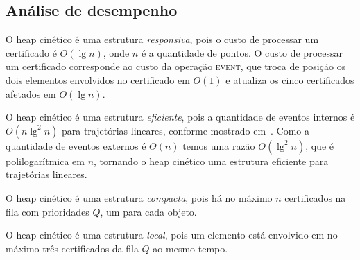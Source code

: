 





\FloatBarrier

\subsection{Análise de desempenho}\label{subsec:heap:analise-de-desempenho}

O heap cinético é uma estrutura \textit{responsiva}, pois o custo de processar
um certificado é $O(\lg{n})$, onde $n$ é a quantidade de pontos.
O custo de processar um certificado corresponde ao custo da operação \textsc{event}, que troca de
posição os dois elementos envolvidos no certificado em $O(1)$ e atualiza os cinco certificados
afetados em $O(\lg{n})$.

O heap cinético é uma estrutura \textit{eficiente}, pois a quantidade de eventos
internos é $O(n\lg^2{n})$ para trajetórias lineares, conforme mostrado em~\cite{basch-thesis}.
Como a quantidade de eventos externos é $\Theta(n)$ temos uma razão $O(\lg^2{n})$, que é
polilogarítmica em $n$, tornando o heap cinético uma estrutura eficiente para trajetórias lineares.

O heap cinético é uma estrutura \textit{compacta}, pois há no máximo $n$
certificados na fila com prioridades $Q$, um para cada objeto.

O heap cinético é uma estrutura \textit{local}, pois um elemento está envolvido
em no máximo três certificados da fila $Q$ ao mesmo tempo.


